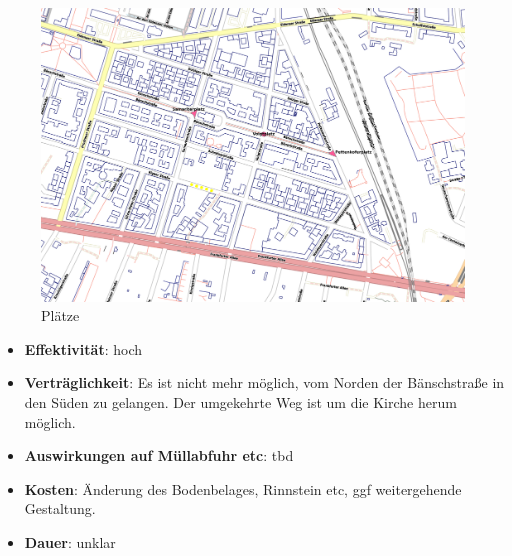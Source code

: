 \documentclass[a4paper,10pt]{scrartcl}
\begin{document}
\begin{figure}[h]
\includegraphics[width=\textwidth]{plaetze.png}
\caption{Plätze}
\end{figure}

\begin{itemize}
 \item \textbf{Effektivität}: hoch
 \item \textbf{Verträglichkeit}: Es ist nicht mehr möglich, vom Norden der Bänschstraße in den Süden zu gelangen. Der umgekehrte Weg ist um die Kirche herum möglich. 
 \item \textbf{Auswirkungen auf Müllabfuhr etc}: tbd
 \item \textbf{Kosten}: Änderung des Bodenbelages, Rinnstein etc, ggf weitergehende Gestaltung.
 \item \textbf{Dauer}: unklar  
\end{itemize}
\end{document}

